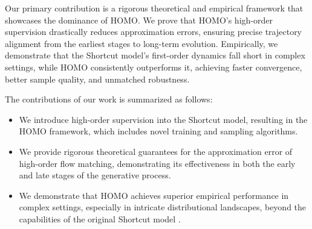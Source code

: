 Our primary contribution is a rigorous theoretical and empirical framework that showcases the dominance of HOMO. We prove that HOMO's high-order supervision drastically reduces approximation errors, ensuring precise trajectory alignment from the earliest stages to long-term evolution. Empirically, we demonstrate that the Shortcut model's first-order dynamics fall short in complex settings, while HOMO consistently outperforms it, achieving faster convergence, better sample quality, and unmatched robustness.

The contributions of our work is summarized as follows:
\begin{itemize}
    \item We introduce high-order supervision into the Shortcut model, resulting in the HOMO framework, which includes novel training and sampling algorithms.
    \item We provide rigorous theoretical guarantees for the approximation error of high-order flow matching, demonstrating its effectiveness in both the early and late stages of the generative process.
    \item We demonstrate that HOMO achieves superior empirical performance in complex settings, especially in intricate distributional landscapes, beyond the capabilities of the original Shortcut model \cite{fhla24}.
\end{itemize}
